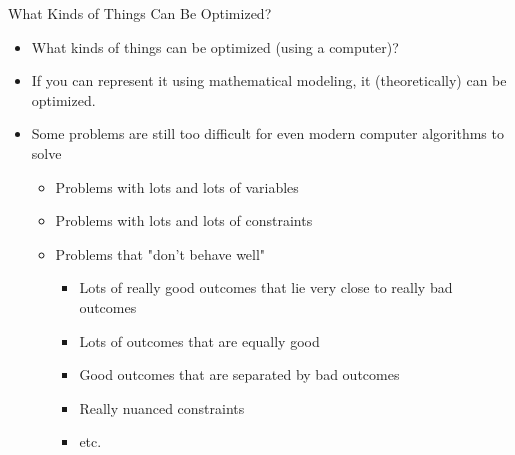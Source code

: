 \documentclass[10pt, aspectratio=169]{beamer}
\begin{document}
\begin{frame}{What Kinds of Things Can Be Optimized?}
    \begin{itemize}
        \item What kinds of things can be optimized (using a computer)?
        \item If you can represent it using mathematical modeling, it (theoretically) can be optimized.
        \item Some problems are still too difficult for even modern computer algorithms to solve
        \begin{itemize}
            \item Problems with lots and lots of variables
            \item Problems with lots and lots of constraints
            \item Problems that "don't behave well"
            \begin{itemize}
                \item Lots of really good outcomes that lie very close to really bad outcomes
                \item Lots of outcomes that are equally good
                \item Good outcomes that are separated by bad outcomes
                \item Really nuanced constraints
                \item etc.
            \end{itemize}
        \end{itemize}
    \end{itemize}
\end{frame}
\end{document}
